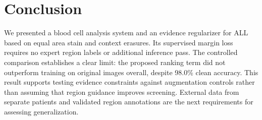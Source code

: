 \documentclass[conference,letterpaper]{IEEEtran}
\begin{document}
\section{Conclusion}
We presented a blood cell analysis system and an evidence regularizer for ALL based on equal area stain and context erasures. Its supervised margin loss requires no expert region labels or additional inference pass. The controlled comparison establishes a clear limit: the proposed ranking term did not outperform training on original images overall, despite 98.0\% clean accuracy. This result supports testing evidence constraints against augmentation controls rather than assuming that region guidance improves screening. External data from separate patients and validated region annotations are the next requirements for assessing generalization.


\end{document}
